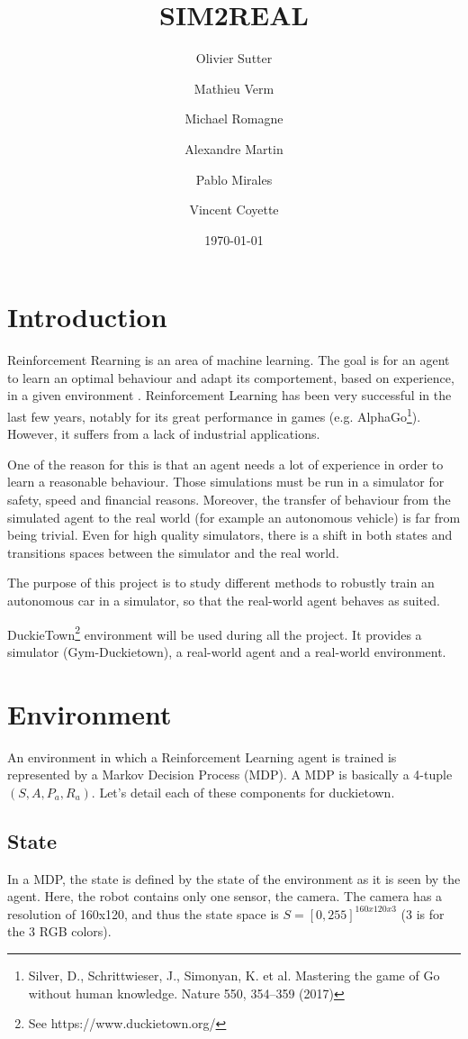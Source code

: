 \documentclass[12pt]{article}
\title{SIM2REAL}
\author{Olivier Sutter \and Mathieu Verm \and Michael Romagne \and Alexandre Martin \and Pablo Mirales \and Vincent Coyette}
\date{\today}
\begin{document}
\maketitle{}

\tableofcontents

\clearpage
\newpage

\section{Introduction}
Reinforcement Rearning is an area of machine learning. The goal is for an agent to learn an optimal behaviour and adapt its comportement, based on experience, in a given environment . Reinforcement Learning has been very successful in the last few years, notably for its great performance in games (e.g. AlphaGo\footnote{Silver, D., Schrittwieser, J., Simonyan, K. et al. Mastering the game of Go without human knowledge. Nature 550, 354–359 (2017)}). However, it suffers from a lack of industrial applications.

One of the reason for this is that an agent needs a lot of experience in order to learn a reasonable behaviour. Those simulations must be run in a simulator for safety, speed and financial reasons. Moreover, the transfer of behaviour from the simulated agent to the real world (for example an autonomous vehicle) is far from being trivial. Even for high quality simulators, there is a shift in both states and transitions spaces between the simulator and the real world.

The purpose of this project is to study different methods to robustly train an autonomous car in a simulator, so that the real-world agent behaves as suited.


DuckieTown\footnote{See https://www.duckietown.org/} environment will be used during all the project. It provides a simulator (Gym-Duckietown), a real-world agent and a real-world environment. 


\section{Environment}
An environment in which a Reinforcement Learning agent is trained is represented by a Markov Decision Process (MDP). A MDP is basically a 4-tuple $(S, A, P_a, R_a)$. Let's detail each of these components for duckietown. 

\subsection{State}
In a MDP, the state is defined by the state of the environment as it is seen by the agent. Here, the robot contains only one sensor, the camera. The camera has a resolution of 160x120, and thus the state space is $S = [0, 255]^{160x120x3}$ (3 is for the 3 RGB colors).
\end{document}
